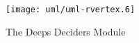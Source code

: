 \begin{figure}[htp]
  \begin{center}
    \texttt{[image: uml/uml-rvertex.6]}
    \caption{The Deeps Deciders Module}
    \label{fig:sim-modules-helpers-deepsdeciders}
  \end{center}
\end{figure}